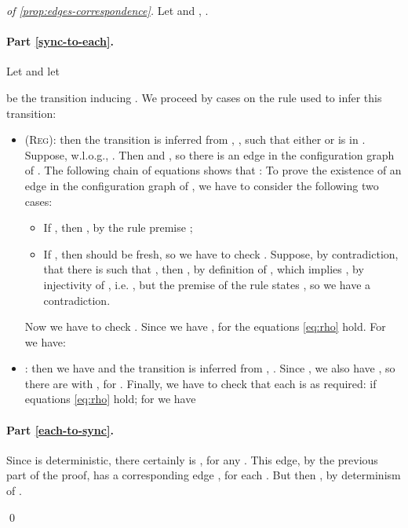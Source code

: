 \begin{proof}[of \cref{prop:edges-correspondence}]
Let  and , .

\paragraph{Part \eqref{sync-to-each}.}
 
Let  and let 
 
be the transition inducing . We proceed by cases on the rule used to infer this transition:
\begin{itemize}
	\item (\textsc{Reg}): then the transition is inferred from , , such that either  or  is in . Suppose, w.l.o.g., . Then  and , so there is an edge  in the configuration graph of . The following chain of equations shows that :
	To prove the existence of an edge  in the configuration graph of , we have to consider the following two cases:
	\begin{itemize}
		\item If , then , by the rule premise ;
\item If , then  should be fresh, so we have to check . Suppose, by contradiction, that there is  such that , then , by definition of , which implies , by injectivity of , i.e. , but the premise of the rule states , so we have a contradiction. 
	\end{itemize}
	Now we have to check . Since we have , for  the equations \eqref{eq:rho} hold. For  we have:
		



	\item \allrule: then we have  and the transition is inferred from , . Since , we also have , so there are  with , for . Finally, we have to check that each  is as required: if  equations \eqref{eq:rho} hold; for  we have
	
	
\end{itemize} 


\paragraph{Part \eqref{each-to-sync}.} 
Since  is deterministic, there certainly is , for any . This edge, by the previous part of the proof, has a corresponding edge , for each . But then , by determinism of .


\qed
\end{proof}

